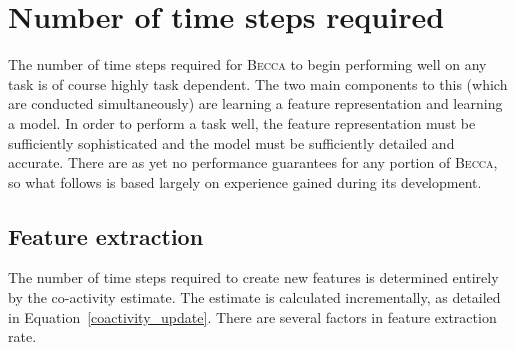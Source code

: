 
\section{Number of time steps required}  

The number of time steps required for \textsc{Becca} to begin performing well on any task is of course highly task dependent. The two main components to this (which are conducted simultaneously) are learning a feature representation and learning a model. In order to perform a task well, the feature representation must be sufficiently sophisticated  and the model must be sufficiently detailed and accurate. There are as yet no performance guarantees for any portion of  \textsc{Becca}, so what follows is based largely on experience gained during its development.

\subsection{Feature extraction}
The number of time steps required to create new features is determined entirely by the co-activity estimate. The estimate is calculated incrementally, as detailed in Equation~\ref{coactivity_update}. There are several factors in feature extraction rate.

